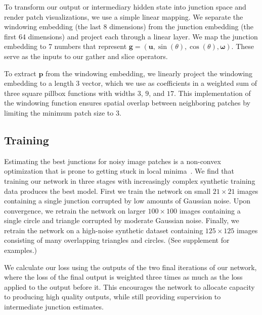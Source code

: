 \documentclass[main.tex]{subfiles}
\begin{document}
To transform our output or intermediary hidden state into junction space and render patch visualizations, we use a simple linear mapping. We separate the windowing embedding (the last 8 dimensions) from the junction embedding (the first 64 dimensions) and project each through a linear layer. We map the junction embedding to 7 numbers that represent $\mathbf{g}=(\boldsymbol{u}, \sin(\theta), \cos(\theta), \boldsymbol{\omega})$. These serve as the inputs to our gather and slice operators. 

To extract $\mathbf{p}$ from the windowing embedding, we linearly project the windowing embedding to a length 3 vector, which we use as coefficients in a weighted sum of three square pillbox functions with widths $3$, $9$, and $17$. This implementation of the windowing function ensures spatial overlap between neighboring patches by limiting the minimum patch size to $3$. 

\subsection{Training}
\label{sec:training}
Estimating the best junctions for noisy image patches is a non-convex optimization that is prone to getting stuck in local minima~\cite{verbin2021field}. We find that training our network in three stages with increasingly complex synthetic training data produces the best model. First we train the network on small $21 \times 21$ images containing a single junction corrupted by low amounts of Gaussian noise. Upon convergence, we retrain the network on larger $100 \times 100$ images containing a single circle and triangle corrupted by moderate Gaussian noise. Finally, we retrain the network on a high-noise synthetic dataset containing $125 \times 125$ images consisting of many overlapping triangles and circles. (See supplement for examples.)

We calculate our loss using the outputs of the two final iterations of our network, where the loss of the final output is weighted three times as much as the loss applied to the output before it. This encourages the network to allocate capacity to producing high quality outputs, while still providing supervision to intermediate junction estimates.
\end{document}
